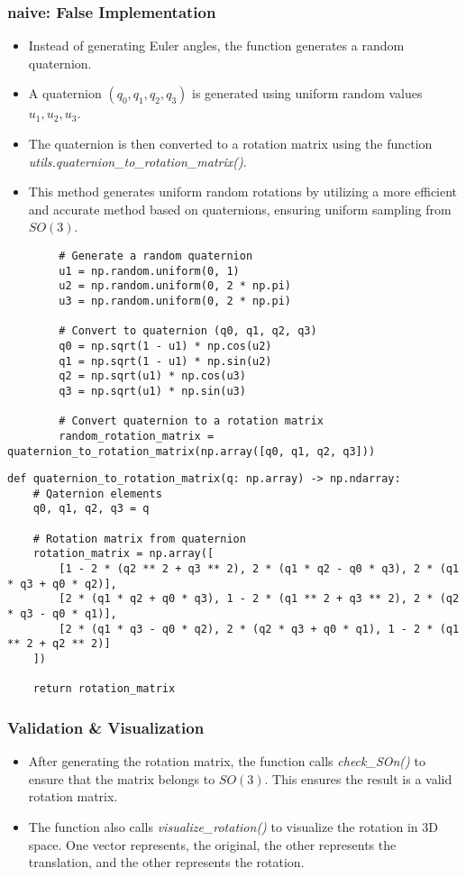 \documentclass[12pt, letterpaper]{article}
\begin{document}
\subsubsection{naive: False Implementation}
\begin{itemize}
    \item{Instead of generating Euler angles, the function generates a random quaternion.}
    \item{A quaternion $(q_0, q_1, q_2, q_3)$ is generated using uniform random values $u_1, u_2, u_3$.}
    \item{The quaternion is then converted to a rotation matrix using the function \textit{utils.quaternion\_to\_rotation\_matrix()}.}
    \item{This method generates uniform random rotations by utilizing a more efficient and accurate method based on quaternions, ensuring uniform sampling from $SO(3)$.}
\end{itemize}
\begin{verbatim}
        # Generate a random quaternion
        u1 = np.random.uniform(0, 1)
        u2 = np.random.uniform(0, 2 * np.pi)
        u3 = np.random.uniform(0, 2 * np.pi)
        
        # Convert to quaternion (q0, q1, q2, q3)
        q0 = np.sqrt(1 - u1) * np.cos(u2)
        q1 = np.sqrt(1 - u1) * np.sin(u2)
        q2 = np.sqrt(u1) * np.cos(u3)
        q3 = np.sqrt(u1) * np.sin(u3)
        
        # Convert quaternion to a rotation matrix
        random_rotation_matrix = quaternion_to_rotation_matrix(np.array([q0, q1, q2, q3]))
\end{verbatim}
\begin{verbatim}
def quaternion_to_rotation_matrix(q: np.array) -> np.ndarray:
    # Qaternion elements
    q0, q1, q2, q3 = q
    
    # Rotation matrix from quaternion
    rotation_matrix = np.array([
        [1 - 2 * (q2 ** 2 + q3 ** 2), 2 * (q1 * q2 - q0 * q3), 2 * (q1 * q3 + q0 * q2)],
        [2 * (q1 * q2 + q0 * q3), 1 - 2 * (q1 ** 2 + q3 ** 2), 2 * (q2 * q3 - q0 * q1)],
        [2 * (q1 * q3 - q0 * q2), 2 * (q2 * q3 + q0 * q1), 1 - 2 * (q1 ** 2 + q2 ** 2)]
    ])
    
    return rotation_matrix
\end{verbatim}
\subsubsection{Validation \& Visualization}
\begin{itemize}
    \item{After generating the rotation matrix, the function calls \textit{check\_SOn()} to ensure that the matrix belongs to $SO(3)$. This ensures the result is a valid rotation matrix.}
    \item{The function also calls \textit{visualize\_rotation()} to visualize the rotation in 3D space. One vector represents, the original, the other represents the translation, and the other represents the rotation.}
\end{itemize}
\end{document}
